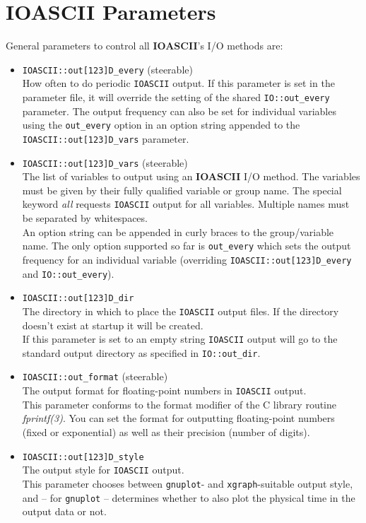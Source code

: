 \documentclass{article}
\begin{document}
\section{{\bf IOASCII} Parameters}
%
General parameters to control all {\bf IOASCII}'s I/O methods are:
\begin{itemize}
  \item {\tt IOASCII::out[123]D\_every} (steerable)\\
        How often to do periodic {\tt IOASCII} output. If this parameter is set in the
        parameter file, it will override the setting of the shared
        {\tt IO::out\_every} parameter. The output frequency can also be set
        for individual variables using the {\tt out\_every} option in an option string appended to the {\tt IOASCII::out[123]D\_vars} parameter.
  \item {\tt IOASCII::out[123]D\_vars} (steerable)\\
        The list of variables to output using an {\bf IOASCII} I/O method.
        The variables must be given by their fully qualified variable or group
        name. The special keyword {\it all} requests {\tt IOASCII} output for
        all variables. Multiple names must be separated by whitespaces.\\
        An option string can be appended in curly braces to the
        group/variable name. The only option supported so far is {\tt out\_every}
        which sets the output frequency for an individual variable (overriding
        {\tt IOASCII::out[123]D\_every} and {\tt IO::out\_every}).
  \item {\tt IOASCII::out[123]D\_dir}\\
        The directory in which to place the {\tt IOASCII} output files.
        If the directory doesn't exist at startup it will be created.\\
        If this parameter is set to an empty string {\tt IOASCII} output will go
        to the standard output directory as specified in {\tt IO::out\_dir}.
  \item {\tt IOASCII::out\_format} (steerable)\\
        The output format for floating-point numbers in {\tt IOASCII} output.\\
        This parameter conforms to the format modifier of the C library routine
        {\it fprintf(3)}. You can set the format for outputting floating-point
        numbers (fixed or exponential) as well as their precision (number of
        digits).
  \item {\tt IOASCII::out[123]D\_style}\\
        The output style for {\tt IOASCII} output.\\
        This parameter chooses between {\tt gnuplot}- and {\tt xgraph}-suitable
        output style, and -- for {\tt gnuplot} -- determines whether to also
        plot the physical time in the output data or not.
\end{itemize}
\end{document}
